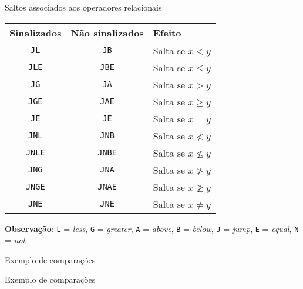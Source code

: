 \begin{frame}[fragile]{Saltos associados aos operadores relacionais}

    \begin{table}[ht]
        \centering
        \begin{tabular}{ccl}
            \toprule
            \textbf{Sinalizados} & \textbf{Não sinalizados} & \textbf{Efeito} \\
            \midrule
                \texttt{JL} & \texttt{JB} & Salta se $x < y$ \\
                \texttt{JLE} & \texttt{JBE} & Salta se $x \leq y$ \\
                \texttt{JG} & \texttt{JA} & Salta se $x > y$ \\
                \texttt{JGE} & \texttt{JAE} & Salta se $x \geq y$ \\
                \texttt{JE} & \texttt{JE} & Salta se $x = y$ \\
            \midrule
                \texttt{JNL} & \texttt{JNB} & Salta se $x \nless y$ \\
                \texttt{JNLE} & \texttt{JNBE} & Salta se $x \nleq y$ \\
                \texttt{JNG} & \texttt{JNA} & Salta se $x \ngtr y$ \\
                \texttt{JNGE} & \texttt{JNAE} & Salta se $x \ngeq y$ \\
                \texttt{JNE} & \texttt{JNE} & Salta se $x \neq y$ \\
            \bottomrule
        \end{tabular}
        
    \end{table}

    \vspace{0.2in}

    \textbf{Observação}: \texttt{L} = \textit{less}, \texttt{G} = \textit{greater}, 
        \texttt{A} = \textit{above}, \texttt{B} = \textit{below}, \texttt{J} = \textit{jump}, 
        \texttt{E} = \textit{equal}, \texttt{N} = \textit{not} 

\end{frame}

\begin{frame}[fragile]{Exemplo de comparações}
\end{frame}

\begin{frame}[fragile]{Exemplo de comparações}
\end{frame}

